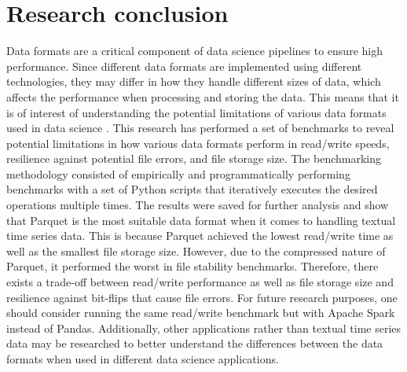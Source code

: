 \section{Research conclusion}
\label{sec:conclusion}
Data formats are a critical component of data science pipelines to ensure high performance. Since different data formats are implemented using different technologies, they may differ in how they handle different sizes of data, which affects the performance when processing and storing the data. This means that it is of interest of understanding the potential limitations of various data formats used in data science \cite{cao_data_2017}. This research has performed a set of benchmarks to reveal potential limitations in how various data formats perform in read/write speeds, resilience against potential file errors, and file storage size. The benchmarking methodology consisted of empirically and programmatically performing benchmarks with a set of Python scripts that iteratively executes the desired operations multiple times. The results were saved for further analysis and show that Parquet is the most suitable data format when it comes to handling textual time series data. This is because Parquet achieved the lowest read/write time as well as the smallest file storage size. However, due to the compressed nature of Parquet, it performed the worst in file stability benchmarks. Therefore, there exists a trade-off between read/write performance as well as file storage size and resilience against bit-flips that cause file errors. For future research purposes, one should consider running the same read/write benchmark but with Apache Spark instead of Pandas. Additionally, other applications rather than textual time series data may be researched to better understand the differences between the data formats when used in different data science applications. 